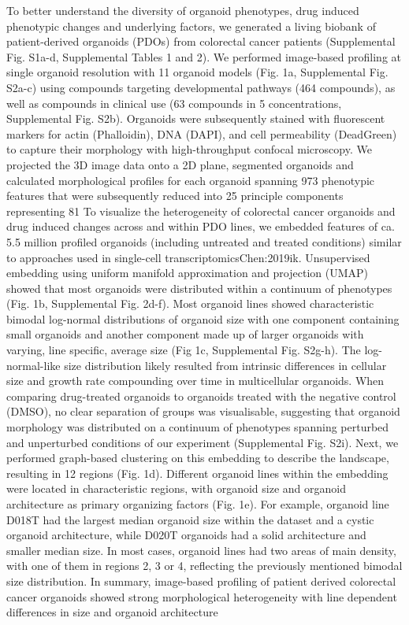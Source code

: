 \begin{flushleft}
To better understand the diversity of organoid phenotypes, drug induced phenotypic changes and underlying factors, we generated a living biobank of patient-derived organoids (PDOs) from colorectal cancer patients (Supplemental Fig. S1a-d, Supplemental Tables 1 and 2). We performed image-based profiling at single organoid resolution with 11 organoid models (Fig. 1a, Supplemental Fig. S2a-c) using compounds targeting developmental pathways (464 compounds), as well as compounds in clinical use (63 compounds in 5 concentrations, Supplemental Fig. S2b). Organoids were subsequently stained with fluorescent markers for actin (Phalloidin), DNA (DAPI), and cell permeability (DeadGreen) to capture their morphology with high-throughput confocal microscopy. We projected the 3D image data onto a 2D plane, segmented organoids and calculated morphological profiles for each organoid spanning 973 phenotypic features that were subsequently reduced into 25 principle components representing 81%
To visualize the heterogeneity of colorectal cancer organoids and drug induced changes across and within PDO lines, we embedded features of ca. 5.5 million profiled organoids (including untreated and treated conditions) similar to approaches used in single-cell transcriptomics{Chen:2019ik}. Unsupervised embedding using uniform manifold approximation and projection (UMAP) showed that most organoids were distributed within a continuum of phenotypes (Fig. 1b, Supplemental Fig. 2d-f). Most organoid lines showed characteristic bimodal log-normal distributions of organoid size with one component containing small organoids and another component made up of larger organoids with varying, line specific, average size (Fig 1c, Supplemental Fig. S2g-h). The log-normal-like size distribution likely resulted from intrinsic differences in cellular size and growth rate compounding over time in multicellular organoids. When comparing drug-treated organoids to organoids treated with the negative control (DMSO), no clear separation of groups was visualisable, suggesting that organoid morphology was distributed on a continuum of phenotypes spanning perturbed and unperturbed conditions of our experiment (Supplemental Fig. S2i). Next, we performed graph-based clustering on this embedding to describe the landscape, resulting in 12 regions (Fig. 1d). Different organoid lines within the embedding were located in characteristic regions, with organoid size and organoid architecture as primary organizing factors (Fig. 1e). For example, organoid line D018T had the largest median organoid size within the dataset and a cystic organoid architecture, while D020T organoids had a solid architecture and smaller median size. In most cases, organoid lines had two areas of main density, with one of them in regions 2, 3 or 4, reflecting the previously mentioned bimodal size distribution. In summary, image-based profiling of patient derived colorectal cancer organoids showed strong morphological heterogeneity with line dependent differences in size and organoid architecture


\end{flushleft}
